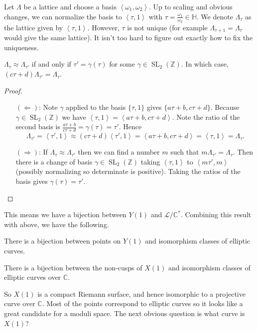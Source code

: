 \documentclass[11pt]{article}
\newcommand{\BB}[1]{\mathbb{#1}} %
\newcommand{\script}[1]{\mathcal{#1}} %
\newcommand{\free}[1]{\left\langle#1\right\rangle} %
\newcommand{\CC}{\BB{C}}
\newcommand{\ZZ}{\BB{Z}}
\newcommand{\HH}{\BB{H}}
\newcommand{\SL}{\operatorname{SL}}
\theoremstyle{plain}
\theoremstyle{remark}
\begin{document}
Let $\Lambda$ be a lattice and choose a basis $\free{\omega_1,\omega_2}$. Up to scaling and obvious changes, we can normalize the basis to $\free{\tau,1}$ with $\tau = \frac{\omega_1}{\omega_2}\in\HH$. We denote $\Lambda_\tau$ as the lattice given by $\free{\tau,1}$. However, $\tau$ is not unique (for example $\Lambda_{\tau+1} = \Lambda_\tau$ would give the same lattice). It isn't too hard to figure out exactly how to fix the uniqueness.
\begin{thm}\label{uniquenessoflattices}
	$\Lambda_{\tau} \approx \Lambda_{\tau'}$ if and only if $\tau' = \gamma(\tau)$ for some $\gamma\in\SL_2(\ZZ)$. In which case, $(c\tau+d)\Lambda_{\tau'} = \Lambda_\tau$.
\end{thm}
\begin{proof}
	\hfill
	\begin{enumerate}
		\item[$(\Leftarrow)$:]
			Note $\gamma$ applied to the basis $\{\tau,1\}$ gives $\{a\tau+b,c\tau+d\}$. Because $\gamma\in\SL_2(\ZZ)$ we have $\free{\tau,1} = \free{a\tau+b,c\tau+d}$. Note the ratio of the second basis is $\frac{a\tau+b}{c\tau+d} = \gamma(\tau) = \tau'$. Hence
			$$
			\Lambda_{\tau'} = \free{\tau',1} \approx (c\tau+d)\free{\tau',1} = \free{a\tau+b,c\tau+d} = \free{\tau,1} = \Lambda_\tau.
			$$
		\item[$(\Rightarrow)$:]
			If $\Lambda_{\tau} \approx \Lambda_{\tau'}$ then we can find a number $m$ such that $m\Lambda_{\tau'} = \Lambda_{\tau}$. Then there is a change of basis $\gamma\in\SL_2(\ZZ)$ taking $\free{\tau,1}$ to $\free{m\tau',m}$ (possibly normalizing so determinate is positive). Taking the ratios of the basis gives $\gamma(\tau) = \tau'$.
	\end{enumerate}
\end{proof}

This means we have a bijection between $Y(1)$ and $\script{L}/\CC^\ast$. Combining this result with above, we have the following.

\begin{thm}\label{Y1moduli}
	There is a bijection between points on $Y(1)$ and isomorphism classes of elliptic curves.
\end{thm}

\begin{cor}\label{X1moduli}
	There is a bijection between the non-cusps of $X(1)$ and isomorphism classes of elliptic curves over $\CC$.
\end{cor}

So $X(1)$ is a compact Riemann surface, and hence isomorphic to a projective curve over $\CC$. Most of the points correspond to elliptic curves so it looks like a great candidate for a moduli space. The next obvious question is what curve is $X(1)$?
\end{document}
